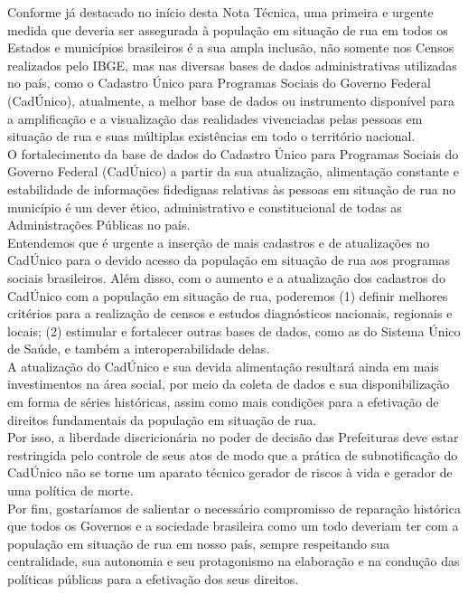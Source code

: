 \documentclass[14pt]{extarticle}
\begin{document}
Conforme já destacado no início desta Nota Técnica, uma primeira e urgente medida que deveria ser assegurada à população em situação de rua em todos os Estados e municípios brasileiros é a sua ampla inclusão, não somente nos Censos realizados pelo IBGE, mas nas diversas bases de dados administrativas utilizadas no país, como o Cadastro Único para Programas Sociais do Governo Federal (CadÚnico), atualmente, a melhor base de dados ou instrumento disponível para a amplificação e a visualização das realidades vivenciadas pelas pessoas em situação de rua e suas múltiplas existências em todo o território nacional.\\

O fortalecimento da base de dados do Cadastro Único para Programas Sociais do Governo Federal (CadÚnico) a partir da sua atualização, alimentação constante e estabilidade de informações fidedignas relativas às pessoas em situação de rua no município é um dever ético, administrativo e constitucional de todas as Administrações Públicas no país.\\

Entendemos que é urgente a inserção de mais cadastros e de atualizações no CadÚnico para o devido acesso da população em situação de rua aos programas sociais brasileiros. Além disso, com o aumento e a atualização dos cadastros do CadÚnico com a população em situação de rua, poderemos (1) definir melhores critérios para a realização de censos e estudos diagnósticos nacionais, regionais e locais; (2) estimular e fortalecer outras bases de dados, como as do Sistema Único de Saúde, e também a interoperabilidade delas.\\

A atualização do CadÚnico e sua devida alimentação resultará ainda em mais investimentos na área social, por meio da coleta de dados e sua disponibilização em forma de séries históricas, assim como mais condições para a efetivação de direitos fundamentais da população em situação de rua.\\ 

Por isso, a liberdade discricionária no poder de decisão das Prefeituras deve estar restringida pelo controle de seus atos de modo que a prática de subnotificação do CadÚnico não se torne um aparato técnico gerador de riscos à vida e gerador de uma política de morte.\\

Por fim, gostaríamos de salientar o necessário compromisso de reparação histórica que todos os Governos e a sociedade brasileira como um todo deveriam ter com a população em situação de rua em nosso país, sempre respeitando sua centralidade, sua autonomia e seu protagonismo na elaboração e na condução das políticas públicas para a efetivação dos seus direitos.\\
\end{document}

